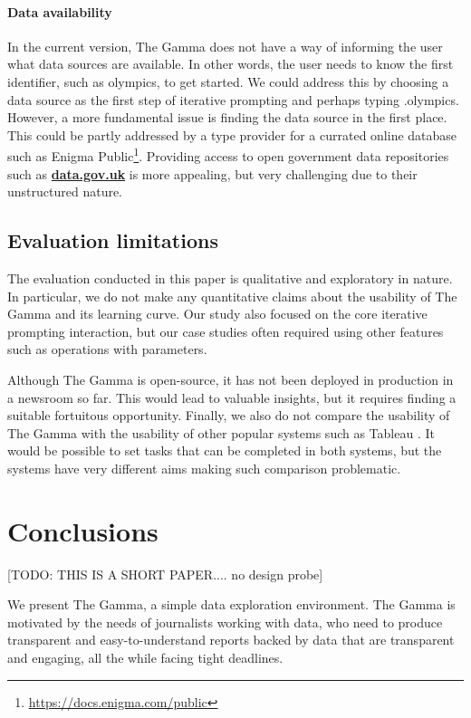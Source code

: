 \documentclass[manuscript,review,anonymous]{acmart}
\newcommand{\ikvd}[1]{{\fontfamily{zi4}\selectfont\small #1}}
\begin{document}
\paragraph{Data availability}
In the current version, The Gamma does not have a way of informing the user what data sources
are available. In other words, the user needs to know the first identifier, such as \ikvd{olympics},
to get started. We could address this by choosing a data source as the first step of iterative
prompting and perhaps typing \ikvd{.olympics}. However, a more fundamental issue is finding
the data source in the first place. This could be partly addressed by a type provider for a
currated online database such as Enigma Public\footnote{\url{https://docs.enigma.com/public}}.
Providing access to open government data repositories such as \href{http://data.gov.uk}{\small\bf\ttfamily data.gov.uk}
is more appealing, but very challenging due to their unstructured nature.

\subsection{Evaluation limitations}
The evaluation conducted in this paper is qualitative and exploratory in nature. In particular,
we do not make any quantitative claims about the usability of The Gamma and its learning curve.
Our study also focused on the core iterative prompting interaction, but our case studies often
required using other features such as operations with parameters.

Although The Gamma is open-source, it has not been deployed in production in a newsroom so far.
This would lead to valuable insights, but it requires finding a suitable fortuitous opportunity.
Finally, we also do not compare the usability of The Gamma with the usability of other popular
systems such as Tableau \cite{tableau}. It would be possible to set tasks that can be completed
in both systems, but the systems have very different aims making such comparison problematic.

\section{Conclusions}
[TODO: THIS IS A SHORT PAPER.... no design probe]

We present The Gamma, a simple data exploration environment. The Gamma is motivated by the needs
of journalists working with data, who need to produce transparent and easy-to-understand reports
backed by data that are transparent and engaging, all the while facing tight deadlines.
\end{document}
